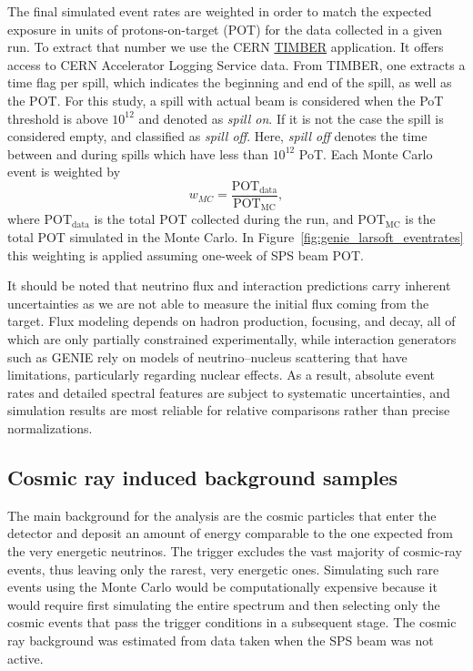 The final simulated event rates are weighted in order to match the expected  exposure in units of protons-on-target (POT) for the data collected in a given run. To extract that number we use the CERN \href{http://timber.cern.ch}{TIMBER} application. It offers access to CERN Accelerator Logging Service data. From TIMBER, one extracts a time flag per spill, which indicates the beginning and end of the spill, as well as the POT. For this study, a spill with actual beam is considered when the PoT threshold is above $10^{12}$ and denoted as \textit{spill on}. If it is not the case the spill is considered empty, and classified as \textit{spill off}. Here, \textit{spill off} denotes the time between and during spills which have less than $10^{12}$ PoT. Each Monte Carlo event is weighted by
\begin{equation}
    w_{MC}= \frac{\text{POT}_{\text{data}}}{\text{POT}_{\text{MC}}},
\end{equation}
where ${\text{POT}_{\text{data}}}$ is the total POT collected during the run, and ${\text{POT}_{\text{MC}}}$ is the total POT simulated in the Monte Carlo. In Figure~\ref{fig:genie_larsoft_eventrates} this weighting is applied assuming one-week of SPS beam POT.

It should be noted that neutrino flux and interaction predictions carry inherent uncertainties as we are not able to measure the initial flux coming from the target. Flux modeling depends on hadron production, focusing, and decay, all of which are only partially constrained experimentally, while interaction generators such as GENIE rely on models of neutrino–nucleus scattering that have limitations, particularly regarding nuclear effects. As a result, absolute event rates and detailed spectral features are subject to systematic uncertainties, and simulation results are most reliable for relative comparisons rather than precise normalizations.

\subsection{Cosmic ray induced background samples}
The main background for the analysis are the cosmic particles that enter the detector and deposit an amount of energy comparable to the one expected from the very energetic neutrinos. The trigger excludes the vast majority of cosmic-ray events, thus leaving only the rarest, very energetic ones. Simulating such rare events using the Monte Carlo would be computationally expensive because it would require first simulating the entire spectrum and then selecting only the cosmic events that pass the trigger conditions in a subsequent stage. 
The cosmic ray background was estimated from data taken when the SPS beam was not active.


